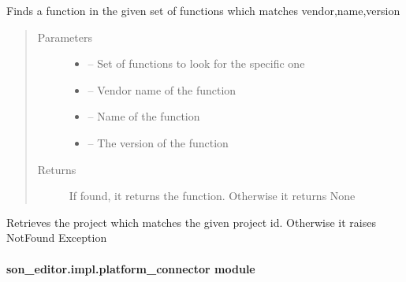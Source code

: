 \documentclass[letterpaper,10pt,english]{sphinxmanual}
\begin{document}
\begin{fulllineitems}
\label{_source/son_editor.impl:son_editor.impl.nsfslookupimpl.get_function}
Finds a function in the given set of functions which matches vendor,name,version
\begin{quote}\begin{description}
\item[{Parameters}] \leavevmode\begin{itemize}
\item {} 
 -- Set of functions to look for the specific one

\item {} 
 -- Vendor name of the function

\item {} 
 -- Name of the function

\item {} 
 -- The version of the function

\end{itemize}

\item[{Returns}] \leavevmode
If found, it returns the function. Otherwise it returns None

\end{description}\end{quote}

\end{fulllineitems}


\begin{fulllineitems}
\label{_source/son_editor.impl:son_editor.impl.nsfslookupimpl.get_project}
Retrieves the project which matches the given project id. Otherwise it raises NotFound Exception

\end{fulllineitems}



\paragraph{son\_editor.impl.platform\_connector module}
\label{_source/son_editor.impl:module-son_editor.impl.platform_connector}\label{_source/son_editor.impl:son-editor-impl-platform-connector-module}
\end{document}

